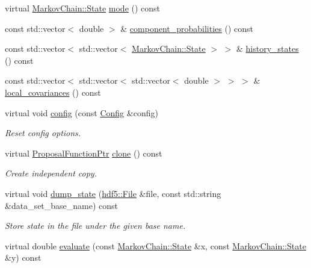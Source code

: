\begin{DoxyCompactItemize}
virtual \hyperlink{structeos_1_1MarkovChain_1_1State}{MarkovChain::State} \hyperlink{classeos_1_1proposal__functions_1_1GlobalLocal_abf3e66748628edc462dd5f7b531f4c2b}{mode} () const 
\item 
const std::vector$<$ double $>$ \& \hyperlink{classeos_1_1proposal__functions_1_1GlobalLocal_aefd282ded908d605356e2c5896db60b7}{component\_\-probabilities} () const 
\item 
const std::vector$<$ std::vector$<$ \hyperlink{structeos_1_1MarkovChain_1_1State}{MarkovChain::State} $>$ $>$ \& \hyperlink{classeos_1_1proposal__functions_1_1GlobalLocal_ab29f6d1d7b79dcb8eae4647260a5bd06}{history\_\-states} () const 
\item 
const std::vector$<$ std::vector$<$ std::vector$<$ double $>$ $>$ $>$ \& \hyperlink{classeos_1_1proposal__functions_1_1GlobalLocal_ad5c45a445627bed86c3d51b13b385956}{local\_\-covariances} () const 
\item 
virtual void \hyperlink{classeos_1_1proposal__functions_1_1GlobalLocal_a32e17ba3e5210c26c146b97f5ff4fd53}{config} (const \hyperlink{structeos_1_1proposal__functions_1_1GlobalLocal_1_1Config}{Config} \&config)
\begin{DoxyCompactList}\small\item\em Reset config options. \item\end{DoxyCompactList}\item 
virtual \hyperlink{namespaceeos_ae97f9891c67c90959a03fc96efaa4dc9}{ProposalFunctionPtr} \hyperlink{classeos_1_1proposal__functions_1_1GlobalLocal_ae0ee0bd2127085ceacb1a89f5527515b}{clone} () const 
\begin{DoxyCompactList}\small\item\em Create independent copy. \item\end{DoxyCompactList}\item 
virtual void \hyperlink{classeos_1_1proposal__functions_1_1GlobalLocal_a07d947ae2de101cc4ef13577d5d81ad5}{dump\_\-state} (\hyperlink{classeos_1_1hdf5_1_1File}{hdf5::File} \&file, const std::string \&data\_\-set\_\-base\_\-name) const 
\begin{DoxyCompactList}\small\item\em Store state in the file under the given base name. \item\end{DoxyCompactList}\item 
virtual double \hyperlink{classeos_1_1proposal__functions_1_1GlobalLocal_ad1f7d7686225e665edd47cbd230483f6}{evaluate} (const \hyperlink{structeos_1_1MarkovChain_1_1State}{MarkovChain::State} \&x, const \hyperlink{structeos_1_1MarkovChain_1_1State}{MarkovChain::State} \&y) const 

\end{DoxyCompactItemize}
